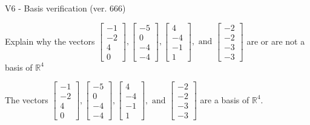 \begin{exercise}
  \begin{exerciseTitle}V6 - Basis verification (ver. 666)\end{exerciseTitle}
  \begin{exerciseStatement}
    Explain why the vectors \(\left[\begin{array}{r}
-1 \\
-2 \\
4 \\
0
\end{array}\right] , \left[\begin{array}{r}
-5 \\
0 \\
-4 \\
-4
\end{array}\right] , \left[\begin{array}{r}
4 \\
-4 \\
-1 \\
1
\end{array}\right] , \text{ and } \left[\begin{array}{r}
-2 \\
-2 \\
-3 \\
-3
\end{array}\right]\) are or are not a basis of \(\mathbb{R}^4\)	


  \end{exerciseStatement}
  \begin{exerciseAnswer}
   The vectors \(\left[\begin{array}{r}
-1 \\
-2 \\
4 \\
0
\end{array}\right] , \left[\begin{array}{r}
-5 \\
0 \\
-4 \\
-4
\end{array}\right] , \left[\begin{array}{r}
4 \\
-4 \\
-1 \\
1
\end{array}\right] , \text{ and } \left[\begin{array}{r}
-2 \\
-2 \\
-3 \\
-3
\end{array}\right]\) 
  	 are  a basis of \(\mathbb{R}^4\).
  


  \end{exerciseAnswer}
\end{exercise}